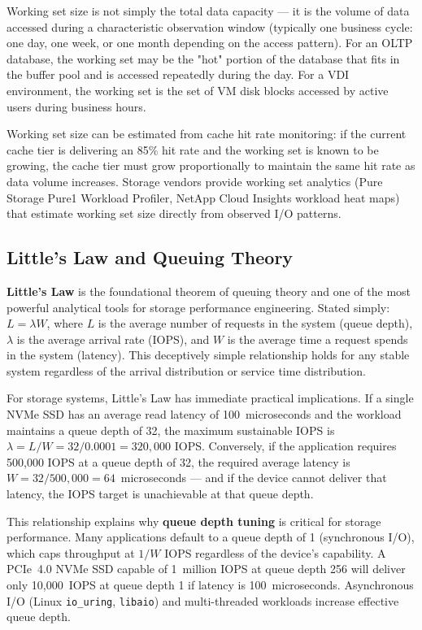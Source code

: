 Working set size is not simply the total data capacity --- it is the volume of data accessed during a characteristic observation window (typically one business cycle: one day, one week, or one month depending on the access pattern). For an OLTP database, the working set may be the "hot" portion of the database that fits in the buffer pool and is accessed repeatedly during the day. For a VDI environment, the working set is the set of VM disk blocks accessed by active users during business hours.

Working set size can be estimated from cache hit rate monitoring: if the current cache tier is delivering an 85\% hit rate and the working set is known to be growing, the cache tier must grow proportionally to maintain the same hit rate as data volume increases. Storage vendors provide working set analytics (Pure Storage Pure1 Workload Profiler, NetApp Cloud Insights workload heat maps) that estimate working set size directly from observed I/O patterns.


\subsection{Little's Law and Queuing Theory}

\textbf{Little's Law} is the foundational theorem of queuing theory and one of the most powerful analytical tools for storage performance engineering. Stated simply: $L = \lambda W$, where $L$ is the average number of requests in the system (queue depth), $\lambda$ is the average arrival rate (IOPS), and $W$ is the average time a request spends in the system (latency). This deceptively simple relationship holds for any stable system regardless of the arrival distribution or service time distribution.

For storage systems, Little's Law has immediate practical implications. If a single NVMe SSD has an average read latency of 100~microseconds and the workload maintains a queue depth of 32, the maximum sustainable IOPS is $\lambda = L / W = 32 / 0.0001 = 320{,}000$ IOPS. Conversely, if the application requires 500{,}000 IOPS at a queue depth of 32, the required average latency is $W = 32 / 500{,}000 = 64$~microseconds --- and if the device cannot deliver that latency, the IOPS target is unachievable at that queue depth.

This relationship explains why \textbf{queue depth tuning} is critical for storage performance. Many applications default to a queue depth of 1 (synchronous I/O), which caps throughput at $1/W$ IOPS regardless of the device's capability. A PCIe~4.0 NVMe SSD capable of 1~million IOPS at queue depth 256 will deliver only 10{,}000~IOPS at queue depth 1 if latency is 100~microseconds. Asynchronous I/O (Linux \texttt{io\_uring}, \texttt{libaio}) and multi-threaded workloads increase effective queue depth.


